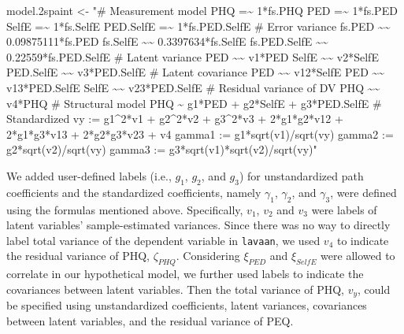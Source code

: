 \documentclass[
  man]{apa7}
\newenvironment{Shaded}{\begin{snugshade}}{\end{snugshade}}
\newcommand{\FloatTok}[1]{\textcolor[rgb]{0.00,0.00,0.81}{#1}}
\newcommand{\NormalTok}[1]{#1}
\newcommand{\OtherTok}[1]{\textcolor[rgb]{0.56,0.35,0.01}{#1}}
\newcommand{\StringTok}[1]{\textcolor[rgb]{0.31,0.60,0.02}{#1}}
\begin{document}
\begin{Shaded}
\begin{Highlighting}[]
\NormalTok{model}\FloatTok{.2}\NormalTok{spaint }\OtherTok{\textless{}{-}} \StringTok{"\# Measurement model}
\StringTok{                    PHQ =\textasciitilde{} 1*fs.PHQ}
\StringTok{                    PED =\textasciitilde{} 1*fs.PED}
\StringTok{                    SelfE =\textasciitilde{} 1*fs.SelfE}
\StringTok{                    PED.SelfE =\textasciitilde{} 1*fs.PED.SelfE}
\StringTok{                  \# Error variance}
\StringTok{                    fs.PED \textasciitilde{}\textasciitilde{} 0.09875111*fs.PED}
\StringTok{                    fs.SelfE \textasciitilde{}\textasciitilde{} 0.3397634*fs.SelfE}
\StringTok{                    fs.PED.SelfE \textasciitilde{}\textasciitilde{} 0.22559*fs.PED.SelfE}
\StringTok{                  \# Latent variance}
\StringTok{                    PED \textasciitilde{}\textasciitilde{} v1*PED}
\StringTok{                    SelfE \textasciitilde{}\textasciitilde{} v2*SelfE}
\StringTok{                    PED.SelfE \textasciitilde{}\textasciitilde{} v3*PED.SelfE}
\StringTok{                  \# Latent covariance}
\StringTok{                    PED \textasciitilde{}\textasciitilde{} v12*SelfE}
\StringTok{                    PED \textasciitilde{}\textasciitilde{} v13*PED.SelfE}
\StringTok{                    SelfE \textasciitilde{}\textasciitilde{} v23*PED.SelfE}
\StringTok{                  \# Residual variance of DV}
\StringTok{                    PHQ \textasciitilde{}\textasciitilde{} v4*PHQ}
\StringTok{                  \# Structural model}
\StringTok{                    PHQ \textasciitilde{} g1*PED + g2*SelfE + g3*PED.SelfE}
\StringTok{                  \# Standardized}
\StringTok{                    vy := g1\^{}2*v1 + g2\^{}2*v2 + g3\^{}2*v3 + 2*g1*g2*v12 + }
\StringTok{                           2*g1*g3*v13 + 2*g2*g3*v23 + v4}
\StringTok{                    gamma1 := g1*sqrt(v1)/sqrt(vy)}
\StringTok{                    gamma2 := g2*sqrt(v2)/sqrt(vy)}
\StringTok{                    gamma3 := g3*sqrt(v1)*sqrt(v2)/sqrt(vy)"}
\end{Highlighting}
\end{Shaded}

We added user-defined labels (i.e., \(g_{1}\), \(g_{2}\), and \(g_{3}\)) for unstandardized path coefficients and the standardized coefficients, namely \(\gamma_{1}\), \(\gamma_{2}\), and \(\gamma_{3}\), were defined using the formulas mentioned above. Specifically, \(v_{1}\), \(v_{2}\) and \(v_{3}\) were labels of latent variables' sample-estimated variances. Since there was no way to directly label total variance of the dependent variable in \texttt{lavaan}, we used \(v_{4}\) to indicate the residual variance of PHQ, \(\zeta_{PHQ}\). Considering \(\xi_{PED}\) and \(\xi_{SelfE}\) were allowed to correlate in our hypothetical model, we further used labels to indicate the covariances between latent variables. Then the total variance of PHQ, \(v_{y}\), could be specified using unstandardized coefficients, latent variances, covariances between latent variables, and the residual variance of PEQ.
\end{document}
